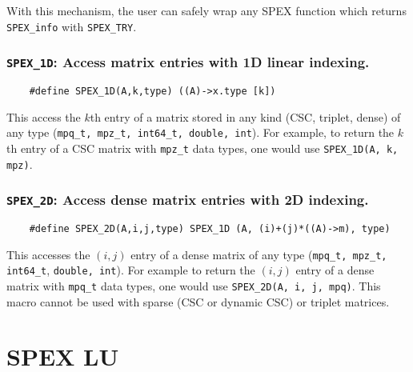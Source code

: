 \documentclass[12pt,oneside]{book}
\theoremstyle{definition}
\begin{document}
With this mechanism, the user can safely wrap any SPEX function which returns \verb|SPEX_info| with \verb|SPEX_TRY|.

\subsection{\texttt{SPEX\_1D}: Access matrix entries with 1D linear indexing.}

\begin{mdframed}[userdefinedwidth=\textwidth]
{\footnotesize
\begin{verbatim}
    #define SPEX_1D(A,k,type) ((A)->x.type [k])
\end{verbatim}
} \end{mdframed}

This access the $k$th entry of a matrix stored in any kind (CSC, triplet, dense) of any type
(\verb'mpq_t, mpz_t, int64_t, double, int'). For example, to return the $k$th entry of a CSC matrix with \verb|mpz_t| data types, one would use \verb|SPEX_1D(A, k, mpz)|.

\subsection{\texttt{SPEX\_2D}: Access dense matrix entries with 2D indexing.}

\begin{mdframed}[userdefinedwidth=\textwidth]
{\footnotesize
\begin{verbatim}
    #define SPEX_2D(A,i,j,type) SPEX_1D (A, (i)+(j)*((A)->m), type)
\end{verbatim}
} \end{mdframed}

This accesses the $(i,j)$ entry of a dense matrix of any type (\verb'mpq_t, mpz_t, int64_t', 
\verb'double, int'). For example to return the $(i,j)$ entry of a dense matrix with \verb|mpq_t| data types, one would use \verb|SPEX_2D(A, i, j, mpq)|.  This macro cannot be used
with sparse (CSC or dynamic CSC) or triplet matrices.

\chapter{SPEX LU}\vspace{-0.75in} \label{ch:LeftLU}
\end{document}
